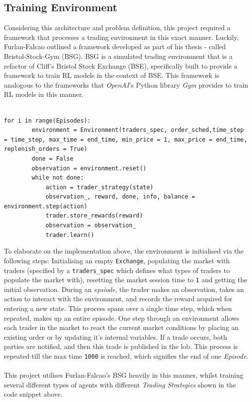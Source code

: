 \documentclass[ %
                    author={Ashwinder Khurana},
                supervisor={Prof Dave Cliff},
                    degree={MEng},
                     title={The Deeply Reinforced Trader},
                  subtitle={},
                      type={enterprise},
                      year={2020} ]{dissertation}
\begin{document}
{\subsection{Training Environment}

\noindent
Considering this architecture and problem definition, this project required a framework that processes a trading environment in this exact manner. Luckily, Furlan-Falcao outlined a framework developed as part of his thesis - called Bristol-Stock-Gym (BSG). BSG is a simulated trading environment that is a refactor of Cliff's Bristol Stock Exchange (BSE), specifically built to provide a framework to train RL models in the context of BSE. This framework is analogous to the frameworks that \textit{OpenAI}'s Python library \textit{Gym} provides to train RL models in this manner. 
\\
\\
\begin{lstlisting}[label=main-loop, caption = Main loop to step through trading environment]
for i in range(Episodes):
        environment = Environment(traders_spec, order_sched,time_step = time_step, max_time = end_time, min_price = 1, max_price = end_time, replenish_orders = True)
        done = False
        observation = environment.reset()
        while not done:
            action = trader_strategy(state)
            observation_, reward, done, info, balance = environment.step(action)
            trader.store_rewards(reward)
            observation = observation_
            trader.learn()
\end{lstlisting}
\noindent
To elaborate on the implementation above, the environment is initialised via the following steps:  Initialising an empty \texttt{Exchange}, populating the market with traders (specified by a \texttt{traders\_spec} which defines what types of traders to populate the market with), resetting the market session time to \texttt{1} and getting the initial observation. During an \textit{epsiode}, the trader makes an observation, takes an action to interact with the environment, and records the reward acquired for entering a new state. This process spans over a single time step, which when repeated, makes up an entire episode. One step through an environment allows each trader in the market to react the current market conditions by placing an existing order or by updating it's internal variables. If a trade occurs, both parties are notified, and then this trade is published in the lob. This process is repeated till the max time \texttt{1000} is reached, which signifies the end of one \textit{Episode}. 
\\
\\
\noindent
This project utilises Furlan-Falcao's BSG heavily in this manner, whilst training several different types of agents with different \textit{Trading Strategies} shown in the code snippet above.

}
\end{document}
